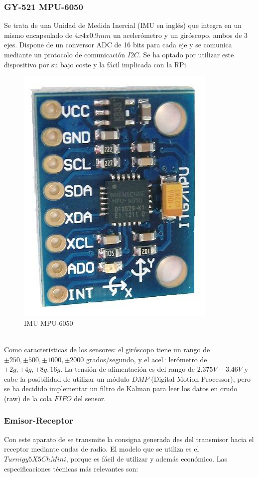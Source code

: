 \documentclass[twoside,11pt]{book}
\begin{document}
\subsubsection*{GY-521 MPU-6050} 
Se trata de una Unidad de Medida Inercial (IMU en inglés) que integra en un mismo encapsulado de $4x4x0.9mm$ un acelerómetro y un giróscopo, ambos de 3 ejes. Dispone de un conversor ADC de 16 bits para cada eje y se comunica mediante un protocolo de comunicación $I2C$. Se ha optado por utilizar este dispositivo por su bajo coste y la fácil implicada con la RPi.
\begin{figure}[h!]
\begin{center}
\includegraphics[scale=0.12,bb=0 0 366 480]{images/mpu-6050.png} 
\caption{IMU MPU-6050}
\end{center}
\end{figure}\\
Como características de los sensores: el giróscopo tiene un rango de  $\pm250,\pm500,\pm1000,\pm2000$ grados/segundo, y el acel·lerómetro de $\pm2g,\pm4g,\pm8g,16g$. La tensión de alimentación es del rango de $2.375V-3.46V$ y cabe la posibilidad de utilizar un módulo $DMP$ (Digital Motion Processor), pero se ha decidido implementar un filtro de Kalman para leer los datos en crudo (raw) de la cola $FIFO$ del sensor.

\subsubsection*{Emisor-Receptor}
Con este aparato de se transmite la consigna generada des del transmisor hacia el receptor mediante ondas de radio. El modelo que se utiliza es el $Turnigy 5X 5Ch Mini$, porque es fácil de utilizar y además económico. Las especificaciones técnicas más relevantes son: 
\end{document}
